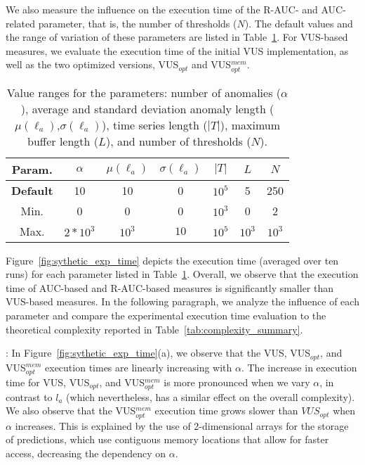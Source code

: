 We also measure the influence on the execution time of the R-AUC- and AUC- related parameter, that is, the number of thresholds ($N$).
The default values and the range of variation of these parameters are listed in Table~\ref{tab:parameter_range_time}. 
For VUS-based measures, we evaluate the execution time of the initial VUS implementation, as well as the two optimized versions, VUS$_{opt}$ and VUS$_{opt}^{mem}$.

\begin{table}[tb]
    \centering
    \caption{Value ranges for the parameters: number of anomalies ($\alpha$), average and standard deviation anomaly length ($\mu(\ell_a)$,$\sigma(\ell_a)$), time series length ($|T|$), maximum buffer length ($L$), and number of thresholds ($N$).}
    \begin{tabular}{|c|c|c|c|c|c|c|} 
 \hline
 Param. & $\alpha$ & $\mu(\ell_a)$ & $\sigma(\ell_{a})$ & $|T|$ & $L$ & $N$ \\ [0.5ex] 
 \hline\hline
 \textbf{Default} & 10 & 10 & 0 & $10^5$ & 5 & 250\\ 
 \hline
 Min. & 0 & 0 & 0 & $10^3$ & 0 & 2 \\
 \hline
 Max. & $2*10^3$ & $10^3$ & $10$ & $10^5$ & $10^3$ & $10^3$ \\ [1ex] 
 \hline
\end{tabular}
    \label{tab:parameter_range_time}
\end{table}


Figure~\ref{fig:sythetic_exp_time} depicts the execution time (averaged over ten runs) for each parameter listed in Table~\ref{tab:parameter_range_time}. 
Overall, we observe that the execution time of AUC-based and R-AUC-based measures is significantly smaller than VUS-based measures.
In the following paragraph, we analyze the influence of each parameter and compare the experimental execution time evaluation to the theoretical complexity reported in Table~\ref{tab:complexity_summary}.

\vspace{0.2cm}
:
In Figure~\ref{fig:sythetic_exp_time}(a), we observe that the VUS, VUS$_{opt}$, and VUS$_{opt}^{mem}$ execution times are linearly increasing with $\alpha$. 
The increase in execution time for VUS, VUS$_{opt}$, and VUS$_{opt}^{mem}$ is more pronounced when we vary $\alpha$, in contrast to $l_a$ (which nevertheless, has a similar effect on the overall complexity). 
We also observe that the VUS$_{opt}^{mem}$ execution time grows slower than $VUS_{opt}$ when $\alpha$ increases. 
This is explained by the use of 2-dimensional arrays for the storage of predictions, which use contiguous memory locations that allow for faster access, decreasing the dependency on $\alpha$.

